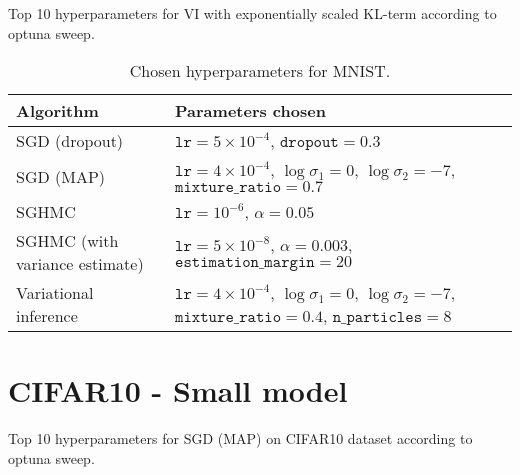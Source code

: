 \begin{table}[H]
    \centering
    \resizebox{
        \ifdim\width>\columnwidth
        \columnwidth
      \else
        \width
      \fi
    }{!}{\small
    
    }
    \caption{Top 10 hyperparameters for VI with exponentially scaled KL-term according to optuna sweep.}
    \label{tab:mnist-vi-exp-weighted-hparams}
\end{table}



\begin{table}[H]
    \centering
    \begin{tabular}{p{4cm}p{9cm}}
        \toprule
        Algorithm & Parameters chosen \\ \midrule
        SGD (dropout) & $\texttt{lr}=5\times 10^{-4}$,
        $\texttt{dropout}=0.3$ \\ \midrule
        SGD (MAP) & 
        $\texttt{lr}=4 \times 10^{-4}$, 
        $\log\sigma_1=0$, 
        $\log\sigma_2=-7$, 
        $\texttt{mixture\_ratio}=0.7$ \\ \midrule
        SGHMC & $\texttt{lr}=10^{-6}$, $\alpha=0.05$ \\ \midrule
        SGHMC (with variance estimate) &  $\texttt{lr}= 5 \times 10^{-8}$, 
        $\alpha=0.003$,
        $\texttt{estimation\_margin}=20$ \\ 
        Variational inference &    
        $\texttt{lr}=4 \times 10^{-4}$,
        $\log\sigma_1=0$,
        $\log\sigma_2=-7$,
        $\texttt{mixture\_ratio}=0.4$,
        $\texttt{n\_particles}=8$ \\
        \bottomrule
    \end{tabular}
    \caption{Chosen hyperparameters for MNIST.}
    \label{tab:mnist-hparams}
\end{table}

\FloatBarrier

\section{CIFAR10 - Small model}

\begin{table}[H]
    \centering
    \resizebox{
        \ifdim\width>\columnwidth
        \columnwidth
      \else
        \width
      \fi
    }{!}{\small
    
    }
    \caption{Top 10 hyperparameters for SGD (MAP) on CIFAR10 dataset according to optuna sweep.}
    \label{tab:cifar-small-sgd-map-hparams}
\end{table}

